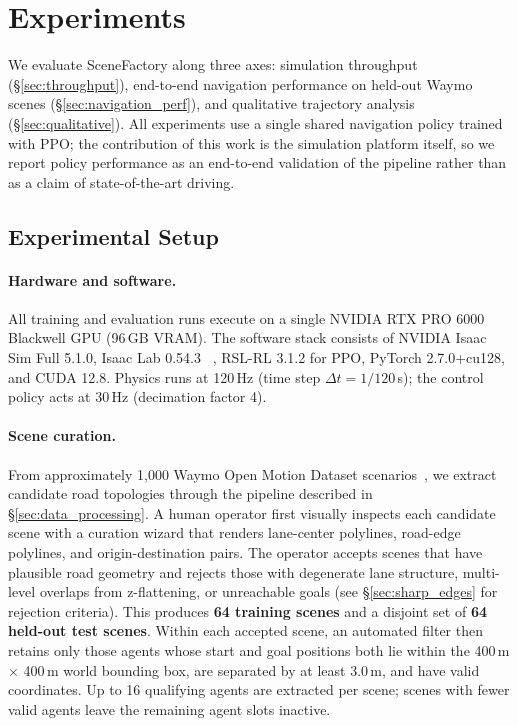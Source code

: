 \section{Experiments}
\label{sec:experiments}

We evaluate SceneFactory along three axes:
simulation throughput (\S\ref{sec:throughput}),
end-to-end navigation performance on held-out Waymo scenes (\S\ref{sec:navigation_perf}),
and qualitative trajectory analysis (\S\ref{sec:qualitative}).
All experiments use a single shared navigation policy trained with PPO; the contribution of this work is the simulation platform itself, so we report policy performance as an end-to-end validation of the pipeline rather than as a claim of state-of-the-art driving.

\subsection{Experimental Setup}
\label{sec:exp_setup}

\paragraph{Hardware and software.}
All training and evaluation runs execute on a single NVIDIA RTX PRO 6000 Blackwell GPU (96\,GB VRAM).
The software stack consists of
NVIDIA Isaac Sim Full 5.1.0,
Isaac Lab 0.54.3 ~\cite{nvidia_isaac_2025},
RSL-RL 3.1.2 for PPO,
PyTorch 2.7.0+cu128, and
CUDA 12.8.
Physics runs at 120\,Hz (time step $\Delta t = 1/120$\,s);
the control policy acts at 30\,Hz (decimation factor 4).

\paragraph{Scene curation.}
From approximately 1{,}000 Waymo Open Motion Dataset scenarios~\cite{Kan_2024_icra},
we extract candidate road topologies through the pipeline described in \S\ref{sec:data_processing}.
A human operator first visually inspects each candidate scene with a curation wizard that renders lane-center polylines, road-edge polylines, and origin-destination pairs.
The operator accepts scenes that have plausible road geometry and rejects those with degenerate lane structure, multi-level overlaps from z-flattening, or unreachable goals (see \S\ref{sec:sharp_edges} for rejection criteria).
This produces \textbf{64 training scenes} and a disjoint set of \textbf{64 held-out test scenes}.
Within each accepted scene, an automated filter then retains only those agents whose start and goal positions both lie within the 400\,m $\times$ 400\,m world bounding box, are separated by at least 3.0\,m, and have valid coordinates.
Up to 16 qualifying agents are extracted per scene; scenes with fewer valid agents leave the remaining agent slots inactive.

